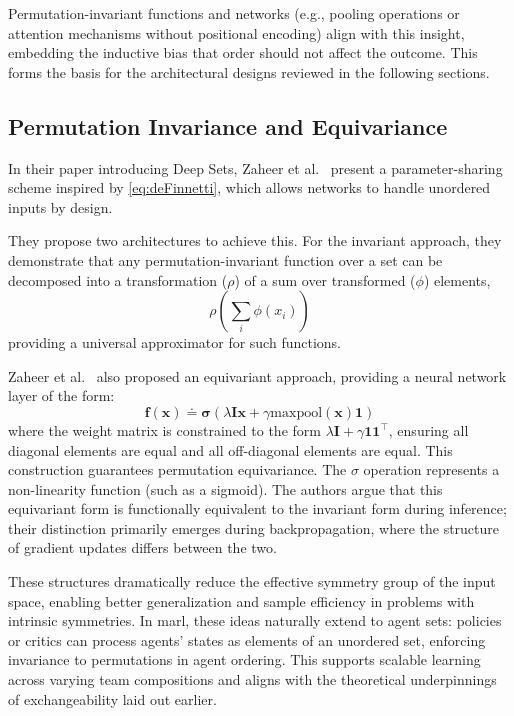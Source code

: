 Permutation-invariant functions and networks (e.g., pooling operations or 
attention mechanisms without positional encoding) align with this insight, %
embedding the inductive bias that order should not affect the outcome. 
This forms the basis for the architectural designs reviewed in the following sections.


\subsection{Permutation Invariance and Equivariance}

In their paper introducing Deep Sets, Zaheer et al.~\cite{zaheer2017} 
present a parameter-sharing scheme inspired by \cref{eq:deFinnetti}, 
which allows networks to handle unordered inputs by design.

They propose two architectures to achieve this.
For the invariant approach, they demonstrate that any 
permutation-invariant function over a set can 
be decomposed into a transformation (\(\rho\)) of a sum over 
transformed (\(\phi\)) elements,
\begin{equation*}
    \rho\left(\sum_i \phi(x_i)\right)
\end{equation*}
providing a universal approximator for such functions. 

Zaheer et al.~\cite{zaheer2017} also proposed an equivariant approach,
providing a neural network layer of the form:
\begin{equation*}
    \mathbf{f}(\mathbf{x}) \doteq \mathbf\sigma (\lambda\mathbf{Ix} 
    + \gamma \text{maxpool}(\mathbf{x})\mathbf{1}) 
\end{equation*}
where the weight matrix is constrained to the form 
\(\lambda\mathbf{I} + \gamma\mathbf{11}^\top\), ensuring all 
diagonal elements are equal and all off-diagonal elements are equal. 
This construction guarantees permutation equivariance.
The \(\sigma\) operation represents a non-linearity function (such as a sigmoid).
The authors argue that this equivariant form is functionally equivalent to the 
invariant form during inference; their distinction primarily emerges during backpropagation, 
where the structure of gradient updates differs between the two.

These structures dramatically reduce the effective symmetry 
group of the input space, enabling better generalization and 
sample efficiency in problems with intrinsic symmetries. 
In \gls{marl}, these ideas naturally extend to agent sets: 
policies or critics can process agents' states as elements 
of an unordered set, enforcing invariance to permutations in agent ordering. 
This supports scalable learning across varying team compositions 
and aligns with the theoretical underpinnings of exchangeability laid out earlier.


